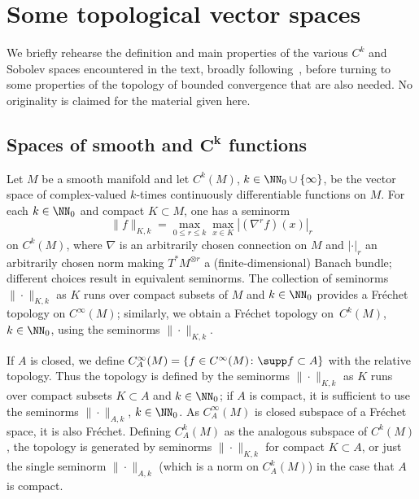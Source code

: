  \appendix
 \section{Some topological vector spaces}\label{appx:topspaces}

 We briefly rehearse the definition and main properties of the various $C^k$ and Sobolev spaces encountered in the text, broadly following~\cite{Baer:2015,BaerWafo:2015}, before turning to some properties of the topology of bounded convergence that are also needed. No originality is claimed for the material given here.

 \subsection[Spaces of smooth and C\^{}k functions]{Spaces of smooth and $\boldsymbol{C^k}$ functions}
 Let $M$ be a smooth manifold and let $C^k(M)$, $k\in\NN_0\cup\{\infty\}$, be the vector space of complex-valued $k$-times continuously differentiable functions on $M$. For each $k\in\NN_0$ and compact $K\subset M$, one has a seminorm
 \begin{equation*}
 	\|f\|_{K,k} = \max_{0\le r\le k} \max_{x\in K} |(\nabla^r f)(x)|_r
 \end{equation*}
 on $C^k(M)$, where $\nabla$ is an arbitrarily chosen connection on $M$ and $|\cdot|_r$ an arbitrarily chosen norm making $T^*M^{\otimes r}$ a (finite-dimensional) Banach bundle; different choices result in equivalent seminorms. The collection of seminorms $\|\cdot\|_{K,k}$ as $K$ runs over compact subsets of $M$ and $k\in\NN_0$ provides a Fr\'echet topology on $C^\infty(M)$; similarly,
 we obtain a Fr\'echet topology on~$C^k(M)$, $k\in\NN_0$, using the seminorms
 $\|\cdot\|_{K,k}$.


 If $A$ is closed, we define $C^\infty_A(M)=\{f\in C^\infty(M)\colon\supp f\subset A\}$ with the relative topology. Thus the topology is defined by the seminorms $\|\cdot\|_{K,k}$ as $K$ runs over compact subsets $K\subset A$ and $k\in\NN_0$; if $A$ is compact, it is sufficient to use the seminorms $\|\cdot\|_{A,k}$, $k\in\NN_0$. As $C^\infty_A(M)$ is closed subspace of a Fr\'echet space, it is also Fr\'echet. Defining $C^k_A(M)$ as the analogous subspace of $C^k(M)$, the topology is generated by seminorms $\|\cdot\|_{K,k}$ for compact $K\subset A$, or just the single seminorm $\|\cdot\|_{A,k}$ (which is a norm on $C^k_A(M)$) in the case that $A$ is compact.

